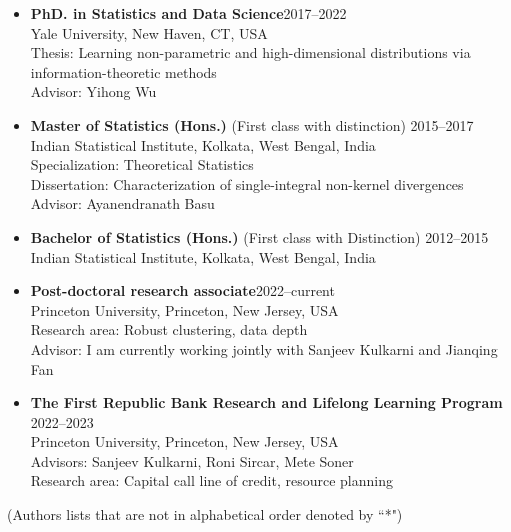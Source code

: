 \documentclass[letterpaper,11pt,oneside]{article}
\theoremstyle{definition}
\begin{document}
	\begin{itemize}
		\item[] {\bf PhD. in Statistics and Data Science}\hfill 2017--2022\\
		Yale University, New Haven, CT, USA\\
		Thesis: Learning non-parametric and high-dimensional distributions via information-theoretic
		methods \\
		Advisor: Yihong Wu  
		
		\item[] {\bf 	Master of Statistics (Hons.)} (First class with distinction) \hfill 2015--2017\\
		Indian Statistical Institute, Kolkata, West Bengal, India\\
		Specialization: Theoretical Statistics\\
		Dissertation: Characterization of single-integral non-kernel divergences \\
		Advisor: Ayanendranath Basu
		
		\item[] 
		{\bf Bachelor of Statistics (Hons.)} (First class with Distinction) \hfill 2012--2015 \\
		{Indian Statistical Institute, Kolkata, West Bengal, India}  
	\end{itemize}
	
	
	\begin{itemize}
		\item[] {\bf Post-doctoral research associate}\hfill 2022--current\\
		 Princeton University, Princeton, New Jersey, USA\\
		Research area: Robust clustering, data depth\\
		Advisor: I am currently working jointly with Sanjeev Kulkarni and Jianqing Fan  
		
		\item[] {\bf The First Republic Bank Research and Lifelong Learning Program} \hfill 2022--2023\\
		Princeton University, Princeton, New Jersey, USA\\
		Advisors: Sanjeev Kulkarni, Roni Sircar, Mete Soner\\
		Research area: Capital call line of credit, resource planning
		
	\end{itemize}


	(Authors lists that are not in alphabetical order denoted by ``*")
		
\end{document}
